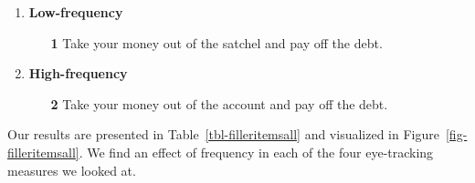 \documentclass[
  12pt,
  letterpaper,
]{scrreprt}
\begin{document}
\begin{enumerate} 

    \item \textbf{Low-frequency}
    \begin{enumerate}
        \item[\textbf{1}] Take your money out of the satchel and pay off the debt.
    \end{enumerate}
    \item \textbf{High-frequency}
    \begin{enumerate}
        \item[\textbf{2}] Take your money out of the account and pay off the debt.
    \end{enumerate} \label{staubsentencefamiliar}
\end{enumerate}

Our results are presented in Table~\ref{tbl-filleritemsall} and
visualized in Figure~\ref{fig-filleritemsall}. We find an effect of
frequency in each of the four eye-tracking measures we looked at.
\end{document}
